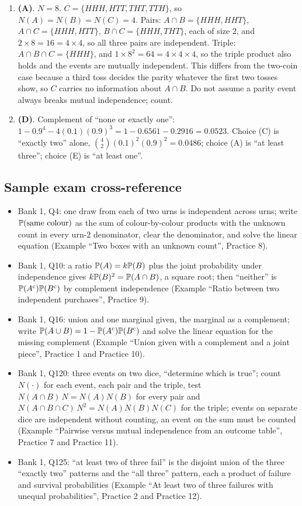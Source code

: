 \begin{enumerate}[label=\arabic*.,nosep]
\item \textbf{(A)}. $N = 8$. $C = \{HHH, HTT, THT, TTH\}$, so $N(A) = N(B) = N(C) = 4$. Pairs: $A \cap B = \{HHH, HHT\}$, $A \cap C = \{HHH, HTT\}$, $B \cap C = \{HHH, THT\}$, each of size $2$, and $2 \times 8 = 16 = 4 \times 4$, so all three pairs are independent. Triple: $A \cap B \cap C = \{HHH\}$, and $1 \times 8^2 = 64 = 4 \times 4 \times 4$, so the triple product also holds and the events are mutually independent. This differs from the two-coin case because a third toss decides the parity whatever the first two tosses show, so $C$ carries no information about $A \cap B$. Do not assume a parity event always breaks mutual independence; count.
\item \textbf{(D)}. Complement of ``none or exactly one'': $1 - 0.9^4 - 4(0.1)(0.9)^3 = 1 - 0.6561 - 0.2916 = 0.0523$. Choice (C) is ``exactly two'' alone, $\binom{4}{2}(0.1)^2(0.9)^2 = 0.0486$; choice (A) is ``at least three''; choice (E) is ``at least one''.
\end{enumerate}

\subsection{Sample exam cross-reference}

\begin{itemize}[nosep]
\item Bank 1, Q4: one draw from each of two urns is independent across urns; write $\mathbb{P}(\text{same colour})$ as the sum of colour-by-colour products with the unknown count in every urn-2 denominator, clear the denominator, and solve the linear equation (Example ``Two boxes with an unknown count'', Practice 8).
\item Bank 1, Q10: a ratio $\mathbb{P}(A) = k\mathbb{P}(B)$ plus the joint probability under independence gives $k\mathbb{P}(B)^2 = \mathbb{P}(A \cap B)$, a square root; then ``neither'' is $\mathbb{P}(A^{\mathrm{c}})\mathbb{P}(B^{\mathrm{c}})$ by complement independence (Example ``Ratio between two independent purchases'', Practice 9).
\item Bank 1, Q16: union and one marginal given, the marginal as a complement; write $\mathbb{P}(A \cup B) = 1 - \mathbb{P}(A^{\mathrm{c}})\mathbb{P}(B^{\mathrm{c}})$ and solve the linear equation for the missing complement (Example ``Union given with a complement and a joint piece'', Practice 1 and Practice 10).
\item Bank 1, Q120: three events on two dice, ``determine which is true''; count $N(\cdot)$ for each event, each pair and the triple, test $N(A \cap B)\,N = N(A)N(B)$ for every pair and $N(A \cap B \cap C)\,N^2 = N(A)N(B)N(C)$ for the triple; events on separate dice are independent without counting, an event on the sum must be counted (Example ``Pairwise versus mutual independence from an outcome table'', Practice 7 and Practice 11).
\item Bank 1, Q125: ``at least two of three fail'' is the disjoint union of the three ``exactly two'' patterns and the ``all three'' pattern, each a product of failure and survival probabilities (Example ``At least two of three failures with unequal probabilities'', Practice 2 and Practice 12).
\end{itemize}

